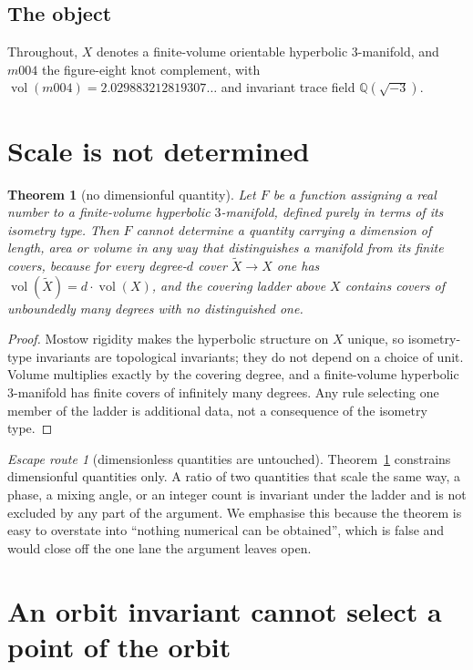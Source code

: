 \documentclass[11pt,a4paper]{article}
\newtheorem{theorem}{Theorem}[section]
\theoremstyle{definition}
\theoremstyle{remark}
\newtheorem{escape}{Escape route}
\newcommand{\Q}{\mathbb{Q}}
\newcommand{\vol}{\operatorname{vol}}
\begin{document}
\subsection{The object}

Throughout, $X$ denotes a finite-volume orientable hyperbolic $3$-manifold, and $m004$ the
figure-eight knot complement, with $\vol(m004)=2.029883212819307\ldots$ and invariant trace field
$\Q(\sqrt{-3})$.

\section{Scale is not determined}\label{sec:scale}

\begin{theorem}[no dimensionful quantity]\label{thm:scale}
Let $F$ be a function assigning a real number to a finite-volume hyperbolic $3$-manifold, defined
purely in terms of its isometry type. Then $F$ cannot determine a quantity carrying a dimension of
length, area or volume in any way that distinguishes a manifold from its finite covers, because
for every degree-$d$ cover $\widetilde X\to X$ one has $\vol(\widetilde X)=d\cdot\vol(X)$, and the
covering ladder above $X$ contains covers of unboundedly many degrees with no distinguished one.
\end{theorem}

\begin{proof}
Mostow rigidity makes the hyperbolic structure on $X$ unique, so isometry-type invariants are
topological invariants; they do not depend on a choice of unit. Volume multiplies exactly by the
covering degree, and a finite-volume hyperbolic $3$-manifold has finite covers of infinitely many
degrees. Any rule selecting one member of the ladder is additional data, not a consequence of the
isometry type.
\end{proof}

\begin{escape}[dimensionless quantities are untouched]\label{esc:ratios}
Theorem~\ref{thm:scale} constrains dimensionful quantities only. A ratio of two quantities that
scale the same way, a phase, a mixing angle, or an integer count is invariant under the ladder and
is not excluded by any part of the argument. We emphasise this because the theorem is easy to
overstate into ``nothing numerical can be obtained'', which is false and would close off the one
lane the argument leaves open.
\end{escape}

\section{An orbit invariant cannot select a point of the orbit}\label{sec:orbit}
\end{document}
